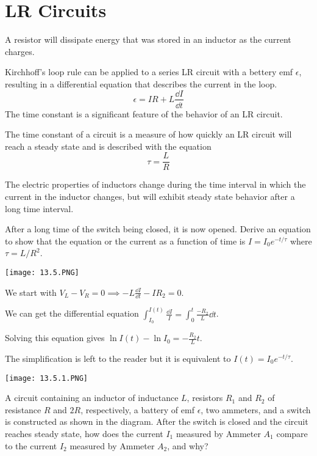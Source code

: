 \documentclass[../em.tex]{subfiles}
\begin{document}
\section{LR Circuits}
A resistor will dissipate energy that was stored in an inductor as the current charges.

Kirchhoff's loop rule can be applied to a series LR circuit with a bettery emf $\epsilon$, resulting in a differential equation that describes the current in the loop.
\[ \epsilon = IR + L\frac{\dd I}{\dd t}\]
The time constant is a significant feature of the behavior of an LR circuit.

The time constant of a circuit is a measure of how quickly an LR circuit will reach a steady state and is described with the equation 
\[ \tau = \frac{L}{R}\]

The electric properties of inductors change during the time interval in which the current in the inductor changes, but will 
exhibit steady state behavior after a long time interval.

\pagebreak
\begin{example}
    After a long time of the switch being closed, it is now opened. Derive an equation to show that the equation or the current as a function of time is $I=I_0e^{-t/\tau}$ where $\tau=L/R^2$.
    \begin{center}
        \texttt{[image: 13.5.PNG]}
    \end{center}

    We start with $V_L-V_R = 0 \implies -L\frac{\dd I}{\dd t}-IR_2=0$.

    We can get the differential equation $\int_{I_0}^{I(t)}\frac{\dd I}{I}=\int_0^t \frac{-R_2}{L}\dd t$.
    
    Solving this equation gives $\ln I(t)-\ln I_0=-\frac{R_2}{L}t$.

    The simplification is left to the reader but it is equivalent to $I(t)=I_0e^{-t/\tau}$.
\end{example}

\ex \begin{center}
    \texttt{[image: 13.5.1.PNG]}
\end{center}
A circuit containing an inductor of inductance $L$, resistors $R_1$ and $R_2$ of resistance $R$ and $2R$, respectively, a battery of emf $\epsilon$, two ammeters, and a switch is constructed as shown in the diagram.
After the switch is closed and the circuit reaches steady state, how does the current $I_1$ measured by Ammeter $A_1$ compare to the current $I_2$ measured by Ammeter $A_2$, and why?
\end{document}
